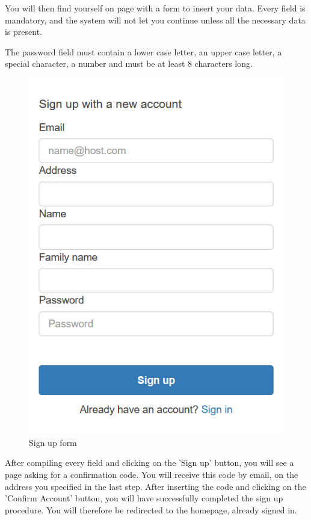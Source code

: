 You will then find yourself on page with a form to insert your data. Every field is mandatory, and the system will not let you continue unless all the necessary data is present. 

The password field must contain a lower case letter, an upper case letter, a special character, a number and must be at least 8 characters long.

\begin{figure}[H]
\centering
\includegraphics[scale=0.6]{res/Immagini/RegisterForm}
\caption{Sign up form}
\end{figure}

After compiling every field and clicking on the 'Sign up' button, you will see a page asking for a confirmation code. You will receive this code by email, on the address you specified in the last step. After inserting the code and clicking on the 'Confirm Account' button, you will have successfully completed the sign up procedure. You will therefore be redirected to the homepage, already signed in.

